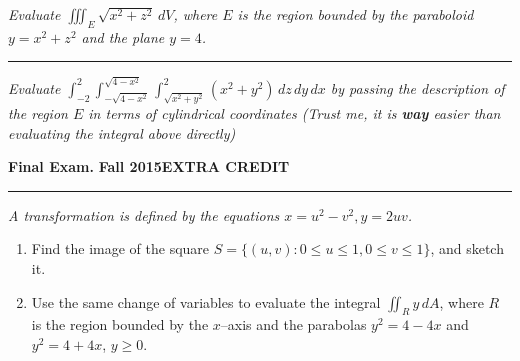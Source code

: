 \documentclass[12pt]{article}
\begin{document}
\bigskip
{\problem[5 pts] \em Evaluate $\iiint_E \sqrt{x^2+z^2}\, dV$, where
  $E$ is the region bounded by the paraboloid $y=x^2+z^2$ and the
  plane $y=4$.}
\vspace{8cm}
\begin{flushright}
\end{flushright}
\hrule
{\problem[5 pts] \em Evaluate $\int_{-2}^2
  \int_{-\sqrt{4-x^2}}^{\sqrt{4-x^2}} \int_{\sqrt{x^2+y^2}}^2
  (x^2+y^2)\, dz\, dy\, dx$ by passing the description of the region
  $E$ in terms of cylindrical coordinates (Trust me, it is
  \textbf{way} easier than evaluating the integral above directly)}
\vspace{8cm}
\begin{flushright}
\end{flushright}
\newpage

\hfill{\large\bf Final Exam.}\hfill{\large\bf
  Fall 2015}\hfill{\large\bf EXTRA CREDIT}\hrule

\bigskip
{ \em A transformation is defined by the equations
  $x=u^2-v^2, y=2uv$.}
\begin{enumerate}
\item Find the image of the square $S=\big\{ (u,v) : 0 \leq u \leq 1,
  0 \leq v \leq 1 \big\}$, and sketch it.
\item Use the same change of variables to evaluate the integral
  $\iint_R y\, dA$, where $R$ is the region bounded by the $x$--axis
  and the parabolas $y^2=4-4x$ and $y^2=4+4x$, $y\geq 0$.
\end{enumerate}
\vspace{18.25cm}
\begin{flushright}
\end{flushright}
\end{document}

